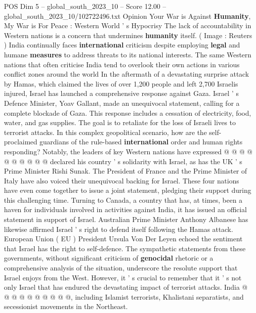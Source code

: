 \begin{textsample}{POS Dim 5 – global\_south\_2023\_10 – Score 12.00 – global\_south\_2023\_10/102722496.txt}  \label{ex:f5_pos_364}
Opinion Your War is Against \textbf{Humanity}, My War is For Peace : Western World ' s Hypocrisy The lack of accountability in Western nations is a concern that undermines \textbf{humanity} itself. ( Image : Reuters ) India continually faces \textbf{international} criticism despite employing \textbf{legal} and humane \textbf{measures} to address threats to its national interests.
The same Western nations that often criticise India tend to overlook their own actions in various conflict zones around the world In the aftermath of a devastating surprise attack by Hamas, which claimed the lives of over 1,200 people and left 2,700 Israelis injured, Israel has launched a comprehensive response against Gaza.
Israel ' s Defence Minister, Yoav Gallant, made an unequivocal statement, calling for a complete blockade of Gaza.
This response includes a cessation of electricity, food, water, and gas supplies.
The goal is to retaliate for the loss of Israeli lives to terrorist attacks.
In this complex geopolitical scenario, how are the self-proclaimed guardians of the rule-based \textbf{international} order and human rights responding?
Notably, the leaders of key Western nations have expressed @ @ @ @ @ @ @ @ @ @ declared his country ' s solidarity with Israel, as has the UK ' s Prime Minister Rishi Sunak.
The President of France and the Prime Minister of Italy have also voiced their unequivocal backing for Israel.
These four nations have even come together to issue a joint statement, pledging their support during this challenging time.
Turning to Canada, a country that has, at times, been a haven for individuals involved in activities against India, it has issued an official statement in support of Israel.
Australian Prime Minister Anthony Albanese has likewise affirmed Israel ' s right to defend itself following the Hamas attack.
European Union ( EU ) President Ursula Von Der Leyen echoed the sentiment that Israel has the right to self-defence.
The sympathetic statements from these governments, without significant criticism of \textbf{genocidal} rhetoric or a comprehensive analysis of the situation, underscore the resolute support that Israel enjoys from the West.
However, it ' s crucial to remember that it ' s not only Israel that has endured the devastating impact of terrorist attacks.
India @ @ @ @ @ @ @ @ @ @, including Islamist terrorists, Khalistani separatists, and secessionist movements in the Northeast.

\end{textsample}
